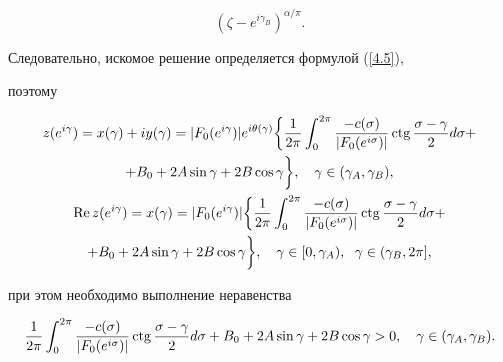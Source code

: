 {\begin{equation}
(\zeta-e^{i\gamma_{B}})^{\alpha/\pi}.


\end{equation}





Следовательно, искомое решение определяется формулой (\ref{4.5}),


поэтому


\begin{gather}\label{14.1}


z(e^{i\gamma})=x(\gamma)+iy(\gamma)=|F_{0}(e^{i\gamma})|e^{i\theta


(\gamma)}\bigg\lbrace\frac{1}{2\pi}\int_{0}^{2\pi}\frac


{-c(\sigma)}{|F_{0}(e^{i\sigma})|}\ctg \frac{\sigma -\gamma}{2}d\sigma+ \\


%


+B_{0}+2A\sin\gamma +2B\cos\gamma\bigg\rbrace,


\quad\gamma\in (\gamma_{A},\gamma_{B}),\notag \\


%


\label{14.2}


\re z(e^{i\gamma})=x(\gamma)=|F_{0}(e^{i\gamma})|


\bigg\lbrace\frac{1}{2\pi}\int_{0}^{2\pi}\frac


{-c(\sigma)}{|F_{0}(e^{i\sigma})|}\ctg \frac{\sigma -\gamma}{2}d\sigma+\\


%


+B_{0}+2A\sin\gamma +2B\cos\gamma\bigg\rbrace,


\quad\gamma\in [0,\gamma_{A}),\ \;\gamma\in(\gamma_{B},2\pi],\notag


\end{gather}


при этом необходимо выполнение неравенства 


\begin{equation}\label{14.3}


\frac{1}{2\pi}\int_{0}^{2\pi}\frac


{-c(\sigma)}{|F_{0}(e^{i\sigma})|}\ctg \frac{\sigma -\gamma}{2}d\sigma


+B_{0}+2A\sin\gamma +2B\cos\gamma > 0,\quad\gamma\in (\gamma_{A},


\gamma_{B}).


\end{equation}





}
